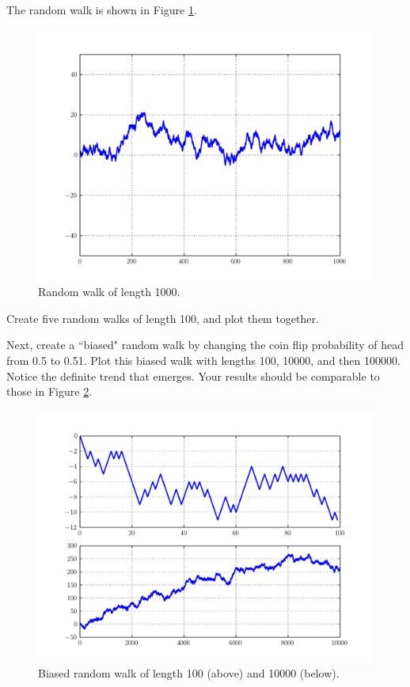 The random walk is shown in Figure \ref{fig:PandasRandomWalk}.

\begin{figure}
\centering
\includegraphics[width=.7 \textwidth]{randomWalk.pdf}
\caption{Random walk of length 1000.}
\label{fig:PandasRandomWalk}
\end{figure}

\begin{problem}
Create five random walks of length 100, and plot them together.

Next, create a ``biased" random walk by changing the coin flip probability of head from 0.5 to 0.51.
Plot this biased walk with lengths 100, 10000, and then 100000. Notice the definite trend that emerges.
Your results should be comparable to those in Figure \ref{pandas:biasedRandomWalk}.
\end{problem}

\begin{figure}
\centering
\includegraphics[width=.7 \textwidth]{biasedRandomWalk.pdf}
\caption{Biased random walk of length 100 (above) and 10000 (below).}
\label{pandas:biasedRandomWalk}
\end{figure}

